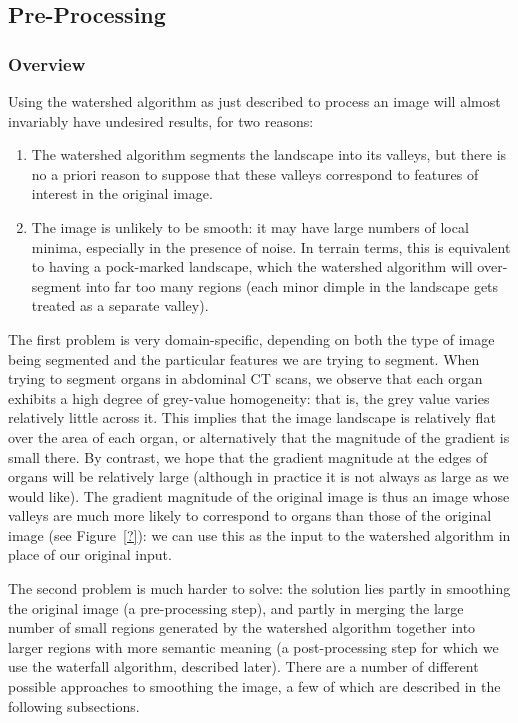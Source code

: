 \subsection{Pre-Processing}

\subsubsection{Overview}

Using the watershed algorithm as just described to process an image will almost invariably have undesired results, for two reasons:
%
\begin{enumerate}
\item The watershed algorithm segments the landscape into its valleys, but there is no a priori reason to suppose that these valleys correspond to features of interest in the original image.
\item The image is unlikely to be smooth: it may have large numbers of local minima, especially in the presence of noise. In terrain terms, this is equivalent to having a pock-marked landscape, which the watershed algorithm will over-segment into far too many regions (each minor dimple in the landscape gets treated as a separate valley).
\end{enumerate}
%
The first problem is very domain-specific, depending on both the type of image being segmented and the particular features we are trying to segment. When trying to segment organs in abdominal CT scans, we observe that each organ exhibits a high degree of grey-value homogeneity: that is, the grey value varies relatively little across it. This implies that the image landscape is relatively flat over the area of each organ, or alternatively that the magnitude of the gradient is small there. By contrast, we hope that the gradient magnitude at the edges of organs will be relatively large (although in practice it is not always as large as we would like). The gradient magnitude of the original image is thus an image whose valleys are much more likely to correspond to organs than those of the original image (see Figure~\ref{?}): we can use this as the input to the watershed algorithm in place of our original input.

The second problem is much harder to solve: the solution lies partly in smoothing the original image (a pre-processing step), and partly in merging the large number of small regions generated by the watershed algorithm together into larger regions with more semantic meaning (a post-processing step for which we use the waterfall algorithm, described later). There are a number of different possible approaches to smoothing the image, a few of which are described in the following subsections.

